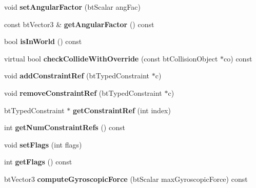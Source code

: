 \begin{DoxyCompactItemize}
\mbox{\label{classbtRigidBody_acf721bf585c46cf0243cbbda1fc4379d}} 
void {\bfseries set\+Angular\+Factor} (bt\+Scalar ang\+Fac)
\item 
\mbox{\label{classbtRigidBody_ae61bd53cfe8b0987b42d30d470faaf09}} 
const bt\+Vector3 \& {\bfseries get\+Angular\+Factor} () const
\item 
\mbox{\label{classbtRigidBody_aa8030ba8a47ea2c00c990bc4227e1ae2}} 
bool {\bfseries is\+In\+World} () const
\item 
\mbox{\label{classbtRigidBody_a91d4b27bcddc7eb3bdc22821ab81dfdc}} 
virtual bool {\bfseries check\+Collide\+With\+Override} (const bt\+Collision\+Object $\ast$co) const
\item 
\mbox{\label{classbtRigidBody_a1c89df31d2a10f06cc81da0e4b573297}} 
void {\bfseries add\+Constraint\+Ref} (bt\+Typed\+Constraint $\ast$c)
\item 
\mbox{\label{classbtRigidBody_a86e4bf13e7acee4be2c77ed470f44dbe}} 
void {\bfseries remove\+Constraint\+Ref} (bt\+Typed\+Constraint $\ast$c)
\item 
\mbox{\label{classbtRigidBody_abecb7d17ec15d9bec435f9fc7e5962fe}} 
bt\+Typed\+Constraint $\ast$ {\bfseries get\+Constraint\+Ref} (int index)
\item 
\mbox{\label{classbtRigidBody_a868c95d4b4405876cf93d12942b66081}} 
int {\bfseries get\+Num\+Constraint\+Refs} () const
\item 
\mbox{\label{classbtRigidBody_a2756c378b93acd3eb16ee27c183efe9d}} 
void {\bfseries set\+Flags} (int flags)
\item 
\mbox{\label{classbtRigidBody_a2ac6c5303690999eaf184882c147338b}} 
int {\bfseries get\+Flags} () const
\item 
\mbox{\label{classbtRigidBody_a82cb76832e357f3ed71996f6717d8064}} 
bt\+Vector3 {\bfseries compute\+Gyroscopic\+Force} (bt\+Scalar max\+Gyroscopic\+Force) const

\end{DoxyCompactItemize}
